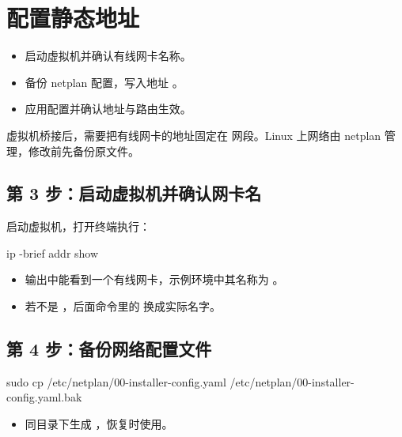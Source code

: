\chapter{配置静态地址}
\label{chap:static}
\begin{intro}
\begin{itemize}
\item 启动虚拟机并确认有线网卡名称。
\item 备份 netplan 配置，写入地址 。
\item 应用配置并确认地址与路由生效。
\end{itemize}
\end{intro}
虚拟机桥接后，需要把有线网卡的地址固定在  网段。Linux 上网络由 netplan 管理，修改前先备份原文件。

\section{第 3 步：启动虚拟机并确认网卡名}
\label{step:3}
启动虚拟机，打开终端执行：

\begin{command}
ip -brief addr show
\end{command}

\begin{expected}
\begin{itemize}
\item 输出中能看到一个有线网卡，示例环境中其名称为 。
\item 若不是 ，后面命令里的  换成实际名字。
\end{itemize}
\end{expected}

\section{第 4 步：备份网络配置文件}
\label{step:4}
\begin{command}
sudo cp /etc/netplan/00-installer-config.yaml /etc/netplan/00-installer-config.yaml.bak
\end{command}

\begin{expected}
\begin{itemize}
\item 同目录下生成 ，恢复时使用。
\end{itemize}
\end{expected}

